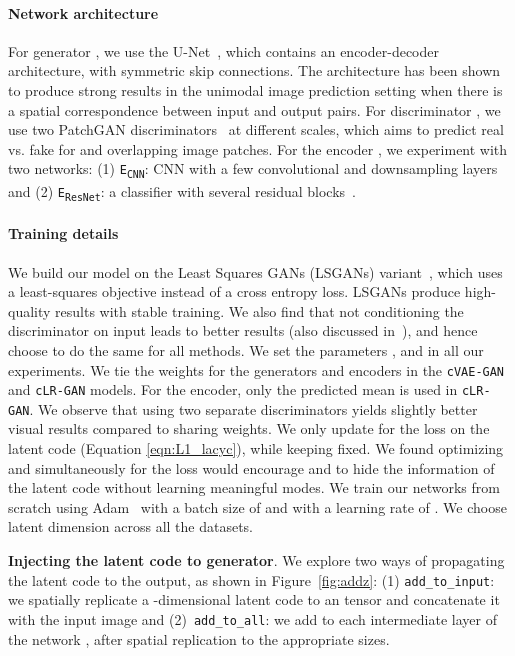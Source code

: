 \documentclass{article}
\newcommand{\cinfogan}{\texttt{cLR-GAN}\xspace}
\newcommand{\cvaegan}{\texttt{cVAE-GAN}\xspace}
\begin{document}
\paragraph{Network architecture} For generator , we use the U-Net~\citep{ronneberger2015u}, which contains an encoder-decoder architecture, with symmetric skip connections. The architecture has been shown to produce strong results in the unimodal image prediction setting when there is a spatial correspondence between input and output pairs. For discriminator , we use two PatchGAN discriminators~\citep{isola2016image} at different scales, which aims to predict real vs. fake for  and  overlapping image patches. For the encoder , we experiment with two networks: (1) \texttt{E\textsubscript{CNN}}: CNN with a few convolutional and downsampling layers and (2) \texttt{E\textsubscript{ResNet}}: a classifier with several residual blocks~\cite{he2016deep}.

\paragraph{Training details} We build our model on the Least Squares GANs (LSGANs) variant~\citep{mao2016least}, which uses a least-squares objective instead of a cross entropy loss. LSGANs produce high-quality results with stable training. We also find that not conditioning the discriminator  on input  leads to better results (also discussed in~\citep{pathakCVPR16context}), and hence choose to do the same for all methods. We set the parameters ,  and  in all our experiments. We tie the weights for the generators and encoders in the \cvaegan and \cinfogan models. For the encoder, only the predicted mean is used in \cinfogan. We observe that using two separate discriminators yields slightly better visual results compared to sharing weights. We only update  for the  loss  on the latent code (Equation \ref{eqn:L1_lacyc}), while keeping  fixed. We found optimizing  and  simultaneously for the loss would encourage  and  to hide the information of the latent code without learning meaningful modes.
We train our networks from scratch using Adam~\citep{kingma2014adam} with a batch size of  and with a learning rate of . We choose latent dimension  across all the datasets. 

{\bf Injecting the latent code  to generator}.
We explore two ways of propagating the latent code  to the output, as shown in Figure~\ref{fig:addz}: 
(1) \texttt{add\_to\_input}: we spatially replicate a -dimensional latent code  to an  tensor and concatenate it with the  input image and (2)~\texttt{add\_to\_all}: we add  to each intermediate layer of the network , after spatial replication to the appropriate sizes.
\end{document}
